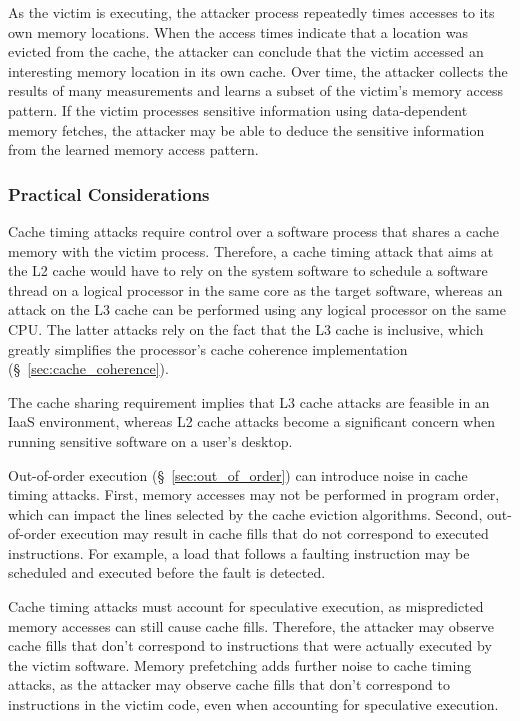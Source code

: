 As the victim is executing, the attacker process repeatedly times accesses to
its own memory locations. When the access times indicate that a location was
evicted from the cache, the attacker can conclude that the victim accessed an
interesting memory location in its own cache. Over time, the attacker collects
the results of many measurements and learns a subset of the victim's memory
access pattern. If the victim processes sensitive information using
data-dependent memory fetches, the attacker may be able to deduce the sensitive
information from the learned memory access pattern.


\subsubsection{Practical Considerations}

Cache timing attacks require control over a software process that shares a
cache memory with the victim process. Therefore, a cache timing attack that
aims at the L2 cache would have to rely on the system software to schedule a
software thread on a logical processor in the same core as the target software,
whereas an attack on the L3 cache can be performed using any logical processor
on the same CPU. The latter attacks rely on the fact that the L3 cache is
inclusive, which greatly simplifies the processor's cache coherence
implementation (\S~\ref{sec:cache_coherence}).

The cache sharing requirement implies that L3 cache attacks are feasible in an
IaaS environment, whereas L2 cache attacks become a significant concern when
running sensitive software on a user's desktop.

Out-of-order execution (\S~\ref{sec:out_of_order}) can introduce noise in cache
timing attacks. First, memory accesses may not be performed in program order,
which can impact the lines selected by the cache eviction algorithms. Second,
out-of-order execution may result in cache fills that do not correspond to
executed instructions. For example, a load that follows a faulting instruction
may be scheduled and executed before the fault is detected.

Cache timing attacks must account for speculative execution, as mispredicted
memory accesses can still cause cache fills. Therefore, the attacker may
observe cache fills that don't correspond to instructions that were actually
executed by the victim software. Memory prefetching adds further noise to cache
timing attacks, as the attacker may observe cache fills that don't correspond
to instructions in the victim code, even when accounting for speculative
execution.


